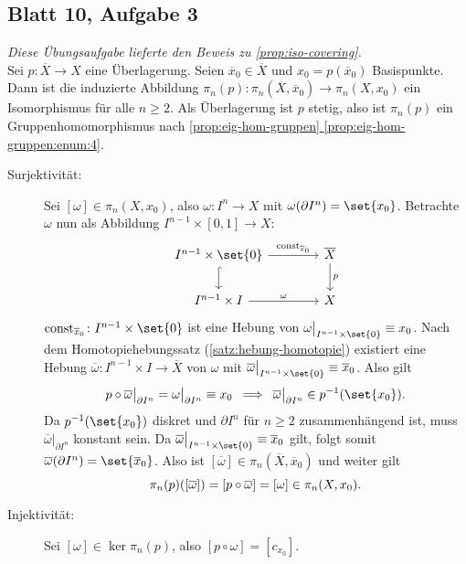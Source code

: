 \subsection{Blatt 10, Aufgabe 3} %
\label{sub:B10A3}
\emph{Diese Übungsaufgabe lieferte den Beweis zu \cref{prop:iso-covering}.} \smallskip \\
Sei $p \colon \overline{X} \to X$ eine Überlagerung. 
Seien $\overline{x}_0  \in \overline{X}$ und $x_0= p(\overline{x}_0 )$ Basispunkte. 
Dann ist die induzierte Abbildung $\pi_n (p) \colon \pi_n(\overline{X}, \overline{x}_0) \to \pi_n(X,x_0)$ ein Isomorphismus für alle $n \ge 2$.
Als Überlagerung ist $p$ stetig, also ist $\pi_n(p)$ ein Gruppenhomomorphismus nach \hyperref[prop:eig-hom-gruppen:enum:4]{ \cref*{prop:eig-hom-gruppen} \ref*{prop:eig-hom-gruppen:enum:4}}.
\begin{description}
	\item[Surjektivität:] Sei $[\omega] \in \pi_n(X,x_0)$, also $\omega \colon I^n \to X$ mit $\omega(\partial I^n) = \set{x_0}$. Betrachte $\omega$ nun als Abbildung $I^{n-1} \times [0,1] \to X$:
	\[
		\begin{tikzcd}[column sep=4em]
			I^{n-1} \times \set{0} \dar[hook] \rar["\mathrm{const}_{\overline{x}_0}"] & \overline{X} \dar["p"]\\
			I^{n-1} \times I \rar["\omega"] & X  
		\end{tikzcd}
	\]
	$\mathrm{const}_{\overline{x}_0} \colon I^{n-1} \times \set{0}$ ist eine Hebung von $\omega\big|_{I^{n-1} \times \set{0}} \equiv x_0$. 
	Nach dem Homotopiehebungssatz (\ref{satz:hebung-homotopie}) existiert eine Hebung $\overline{\omega} \colon I^{n-1} \times I \to \overline{X}$ von $\omega$ mit $\overline{\omega}\big|_{I^{n-1} \times \set{0}} \equiv \overline{x}_0 $. 
	Also gilt
	\[
		p \circ \overline{\omega} \big|_{\partial I^n} = \omega \big|_{\partial I^n} \equiv x_0 \enspace \Longrightarrow \enspace \overline{\omega} \big|_{\partial I^n} 
		\in p ^{-1}( \set{x_0} ) .
	\]
	Da $p^{-1}(\set{x_0})$ diskret und $\partial I^n$ für $n \ge 2$ zusammenhängend ist, muss $\overline{\omega} \big|_{\partial I^n}$ konstant sein. 
	Da $\overline{\omega}\big|_{I^{n-1} \times \set{0}} \equiv \overline{x}_0 $ gilt, folgt somit $\overline{\omega}(\partial I^n) = \set{\overline{x}_0}$. 
	Also ist $[\overline{\omega}] \in \pi_n(\overline{X},\overline{x}_0)$ und weiter gilt
	\[
		\pi_n(p) \enbrace*{[\overline{\omega}]} = [p \circ \overline{\omega} ] = [\omega] \in \pi_n(X,x_0). 
	\]
	\item[Injektivität:] Sei $[\omega] \in \ker \pi_n(p)$, also $[p \circ \omega] = [c_{x_0}]$. 

\end{description}

